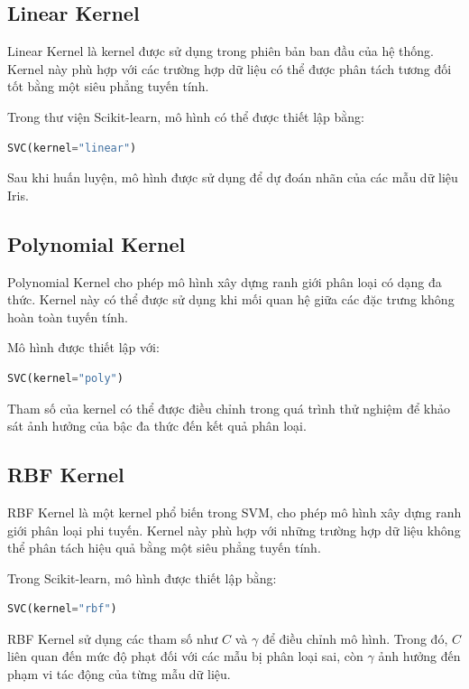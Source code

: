 \documentclass[12pt,a4paper]{report}
\begin{document}
	\subsection{Linear Kernel}
	
	Linear Kernel là kernel được sử dụng trong phiên bản ban đầu của hệ thống. Kernel này phù hợp với các trường hợp dữ liệu có thể được phân tách tương đối tốt bằng một siêu phẳng tuyến tính.
	
	\noindent
	Trong thư viện Scikit-learn, mô hình có thể được thiết lập bằng:
	
	\begin{lstlisting}[language=Python]
		SVC(kernel="linear")
	\end{lstlisting}
	
	Sau khi huấn luyện, mô hình được sử dụng để dự đoán nhãn của các mẫu dữ liệu Iris.
	
	\subsection{Polynomial Kernel}
	
	Polynomial Kernel cho phép mô hình xây dựng ranh giới phân loại có dạng đa thức. Kernel này có thể được sử dụng khi mối quan hệ giữa các đặc trưng không hoàn toàn tuyến tính.
	
	\noindent
	Mô hình được thiết lập với:
	
	\begin{lstlisting}[language=Python]
		SVC(kernel="poly")
	\end{lstlisting}
	
	Tham số của kernel có thể được điều chỉnh trong quá trình thử nghiệm để khảo sát ảnh hưởng của bậc đa thức đến kết quả phân loại.
	
	\subsection{RBF Kernel}
	
	RBF Kernel là một kernel phổ biến trong SVM, cho phép mô hình xây dựng ranh giới phân loại phi tuyến. Kernel này phù hợp với những trường hợp dữ liệu không thể phân tách hiệu quả bằng một siêu phẳng tuyến tính.
	
	\noindent
	Trong Scikit-learn, mô hình được thiết lập bằng:
	
	\begin{lstlisting}[language=Python]
		SVC(kernel="rbf")
	\end{lstlisting}
	
	RBF Kernel sử dụng các tham số như $C$ và $\gamma$ để điều chỉnh mô hình. Trong đó, $C$ liên quan đến mức độ phạt đối với các mẫu bị phân loại sai, còn $\gamma$ ảnh hưởng đến phạm vi tác động của từng mẫu dữ liệu.
	
\end{document}
